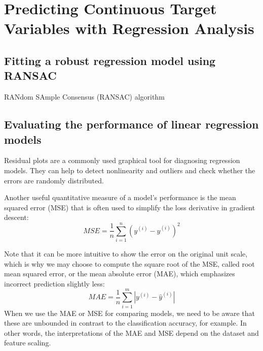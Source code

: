 \chapter{Predicting Continuous Target Variables with Regression Analysis\label{Ch09}}
\section{Fitting a robust regression model using RANSAC}
\begin{algorithm}
    \caption{RANdom SAmple Consensus (RANSAC) algorithm}
\end{algorithm}

\section{Evaluating the performance of linear regression models}
Residual plots are a commonly used graphical tool for diagnosing regression models. They can help to detect nonlinearity and outliers and check whether the errors are randomly distributed.

Another useful quantitative measure of a model's performance is the mean squared error (MSE) that is often used to simplify the loss derivative in gradient descent:
\begin{equation}
    MSE=\frac{1}{n}\sum_{i=1}^{n}(y^{(i)}-\hat{y}^{(i)})^2
\end{equation}

Note that it can be more intuitive to show the error on the original unit scale, which is why we may choose to compute the square root of the MSE, called root mean squared error, or the mean absolute error (MAE), which emphasizes incorrect prediction slightly less:
\begin{equation}
    MAE=\frac{1}{n}\sum_{i=1}^{m}|y^{(i)}-\hat{y}^{(i)}|
\end{equation}
When we use the MAE or MSE for comparing models, we need to be aware that these are unbounded in contrast to the classification accuracy, for example. In other words, the interpretations of the MAE and MSE depend on the dataset and feature scaling.


